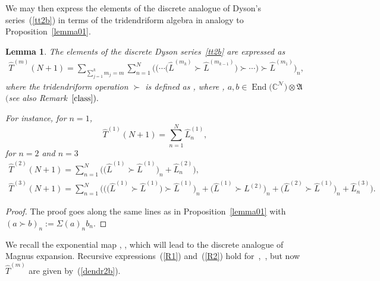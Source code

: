 \documentclass[pdftex]{sigma}
\numberwithin{equation}{section}
\newtheorem{lem}[thm]{Lemma}
\theoremstyle{definition}
\DeclareMathOperator{\EEnd}{End}%
\begin{document}
We may then express the elements of the discrete analogue of Dyson's series~(\ref{tt2b}) in terms of the
tridendriform algebra in analogy to Proposition~\ref{lemma01}.
{\begin{lem}{\label{lemmahat}}
The elements of the discrete Dyson series~\eqref{tt2b} are expressed as
\begin{eqnarray}
\hat T^{(m)}(N+1) = \sum_{\sum_{j=1}^km_j=m}\sum_{n=1}^N \bigl( \bigl(\cdots \bigl( \hat L^{(m_k)}\succ \hat L^{(m_{k-1})}\bigr) \succ \cdots \bigr)\succ \hat L^{(m_1)}\bigr)_n , \label{dendr2b}
\end{eqnarray}
where the tridendriform operation $\succ$ is defined as
, where , $a, b \in \EEnd\bigl({\mathbb C}^{\mathcal N}\bigr) \otimes{\mathfrak A}$ $($see also Remark~$\ref{class}).$

For instance, for $n=1$,
\[
\hat T^{(1)}(N+1)= \sum_{n=1}^N \hat L^{(1)}_n,
\]
 for $n=2$ and $n=3$
\begin{gather*}
\hat T^{(2)}(N+1) =
 \sum_{n=1}^N \bigl( \bigl(\hat L^{(1)} \succ \hat L^{(1)}\bigr)_n + \hat L_n^{(2)}\bigr),\\
\hat T^{(3)}(N+1)= \sum_{n=1}^N \bigl( \bigl(\bigl(\hat L^{(1)} \succ \hat L^{(1)}\bigr)\succ \hat L^{(1)}\bigr)_n +
\bigl(\hat L^{(1)}\succ L^{(2)} \bigr)_n + \bigl(\hat L^{(2)} \succ \hat L^{(1)}\bigr)_n + \hat L_n^{(3)}\bigr).
\end{gather*}
\end{lem}
\begin{proof} The proof goes along the same lines as in Proposition~\ref{lemma01} with $(a\succ b)_n := \Sigma(a)_n b_n$.
\end{proof}}

We recall the exponential map ,
,
which will lead to the discrete analogue of Magnus expansion.
{Recursive expressions~(\ref{R1}) and~(\ref{R2}) hold for~,~, but now $\hat T^{(m)}$ are given by~(\ref{dendr2b}).}
\end{document}
